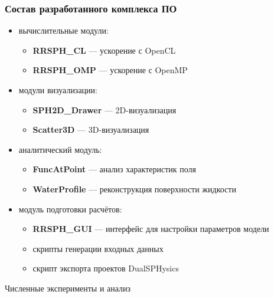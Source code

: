 \begin{frame}
    \frametitle{Состав разработанного комплекса ПО}
    \begin{itemize}
        \item вычислительные модули:
            \begin{itemize}
                \item \textbf{RRSPH\_CL} --- ускорение с OpenCL
                \item \textbf{RRSPH\_OMP} --- ускорение с OpenMP
            \end{itemize}
        \item модули визуализации:
            \begin{itemize}
                \item \textbf{SPH2D\_Drawer} --- 2D-визуализация
                \item \textbf{Scatter3D} --- 3D-визуализация
            \end{itemize}
        \item аналитический модуль:
            \begin{itemize}
                \item \textbf{FuncAtPoint} --- анализ характеристик поля
                \item \textbf{WaterProfile} --- реконструкция поверхности жидкости
            \end{itemize}
        \item модуль подготовки расчётов:
            \begin{itemize}
                \item \textbf{RRSPH\_GUI} --- интерфейс для настройки параметров модели
                \item скрипты генерации входных данных
                \item скрипт экспорта проектов DualSPHysics
            \end{itemize}
    \end{itemize}
    
\end{frame}

\begin{frame}
    \begin{center}
        \Huge
        Численные эксперименты и анализ
    \end{center}
\end{frame}

